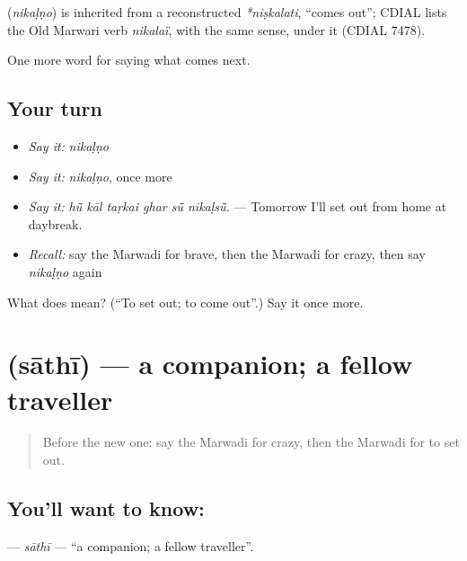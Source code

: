 \begin{cousinweb}
\textbf{} (\emph{nikaḷṇo}) is inherited from a reconstructed \emph{*niṣkalati}, \textquotedblleft{}comes out\textquotedblright{}; CDIAL lists the Old Marwari verb \emph{nikalaï}, with the same sense, under it (CDIAL 7478).
\end{cousinweb}

\begin{grammarlens}[title={What you've built}]
One more word for saying what comes next.
\end{grammarlens}

\subsection*{Your turn}
\begin{itemize}
\raggedright
  \item \emph{Say it:} \emph{nikaḷṇo}
  \item \emph{Say it:} \emph{nikaḷṇo}, once more
  \item \emph{Say it:} \emph{hū̃ kāl taṛkai ghar sū̃ nikaḷsū̃.} — Tomorrow I'll set out from home at daybreak.
  \item \emph{Recall:} say the Marwadi for brave, then the Marwadi for crazy, then say \emph{nikaḷṇo} again
\end{itemize}

\begin{tcolorbox}[breakable,colback=teal!4,colframe=teal!35!black,title={Before you move on}]
What does  mean? (\textquotedblleft{}To set out; to come out\textquotedblright{}.) Say it once more.
\end{tcolorbox}
\section[\texorpdfstring{\mw{साथी} (sāthī)}{साथी (sāthī)}]{ (sāthī) — a companion; a fellow traveller}

\label{lesson:MW-C216-sathi}



\begin{quote}
Before the new one: say the Marwadi for crazy, then the Marwadi for to set out.
\end{quote}

\subsection*{You'll want to know: }
\textbf{} — \emph{sāthī} — \textquotedblleft{}a companion; a fellow traveller\textquotedblright{}.

